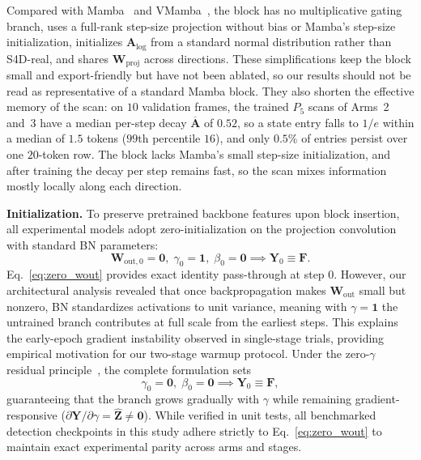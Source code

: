 Compared with Mamba~\cite{gu2023mamba} and VMamba~\cite{liu2024vmamba}, the block has no multiplicative gating branch, uses a full-rank step-size projection without bias or Mamba's step-size initialization, initializes $\mathbf{A}_{\text{log}}$ from a standard normal distribution rather than S4D-real, and shares $\mathbf{W}_{\text{proj}}$ across directions. These simplifications keep the block small and export-friendly but have not been ablated, so our results should not be read as representative of a standard Mamba block. They also shorten the effective memory of the scan: on $10$ validation frames, the trained $P_5$ scans of Arms~2 and~3 have a median per-step decay $\overline{\mathbf{A}}$ of $0.52$, so a state entry falls to $1/e$ within a median of $1.5$ tokens ($99$th percentile $16$), and only $0.5\%$ of entries persist over one $20$-token row. The block lacks Mamba's small step-size initialization, and after training the decay per step remains fast, so the scan mixes information mostly locally along each direction.

\textbf{Initialization.} To preserve pretrained backbone features upon block insertion, all experimental models adopt zero-initialization on the projection convolution with standard BN parameters:
\begin{equation}
    \mathbf{W}_{\text{out},0} = \mathbf{0}, \; \gamma_0 = \mathbf{1}, \; \beta_0 = \mathbf{0} \implies \mathbf{Y}_0 \equiv \mathbf{F}.
    \label{eq:zero_wout}
\end{equation}
Eq.~\eqref{eq:zero_wout} provides exact identity pass-through at step $0$. However, our architectural analysis revealed that once backpropagation makes $\mathbf{W}_{\text{out}}$ small but nonzero, BN standardizes activations to unit variance, meaning with $\gamma = \mathbf{1}$ the untrained branch contributes at full scale from the earliest steps. This explains the early-epoch gradient instability observed in single-stage trials, providing empirical motivation for our two-stage warmup protocol. Under the zero-$\gamma$ residual principle~\cite{goyal2017accurate}, the complete formulation sets
\begin{equation}
    \gamma_0 = \mathbf{0}, \; \beta_0 = \mathbf{0} \implies \mathbf{Y}_0 \equiv \mathbf{F},
    \label{eq:zero_gamma}
\end{equation}
guaranteeing that the branch grows gradually with $\gamma$ while remaining gradient-responsive ($\partial \mathbf{Y} / \partial \gamma = \hat{\mathbf{Z}} \neq \mathbf{0}$). While verified in unit tests, all benchmarked detection checkpoints in this study adhere strictly to Eq.~\eqref{eq:zero_wout} to maintain exact experimental parity across arms and stages.

